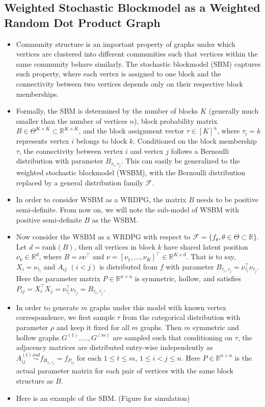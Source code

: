 \documentclass[a4paper]{article}
\begin{document}
\subsection{Weighted Stochastic Blockmodel as a Weighted Random Dot Product Graph}
\label{section:WSBM}
\begin{itemize}
\item Community structure is an important property of graphs under which vertices are clustered into different communities such that vertices within the same community behave similarly. The stochastic blockmodel (SBM) \cite{holland1983stochastic} captures such property, where each vertex is assigned to one block and the connectivity between two vertices depends only on their respective block memberships.
\item Formally, the SBM is determined by the number of blocks $K$ (generally much smaller than the number of vertices $n$), block probability matrix $B \in \Theta^{K \times K} \subset \mathbb{R}^{K \times K}$, and the block assignment vector $\tau \in [K]^n$, where $\tau_i = k$ represents vertex $i$ belongs to block $k$. Conditioned on the block membership $\tau$, the connectivity between vertex $i$ and vertex $j$ follows a Bernoulli distribution with parameter $B_{\tau_i, \tau_j}$. This can easily be generalized to the weighted stochastic blockmodel (WSBM), with the Bernoulli distribution replaced by a general distribution family $\mathcal{F}$.
\item In order to consider WSBM as a WRDPG, the matrix $B$ needs to be positive semi-definite. From now on, we will note the sub-model of WSBM with positive semi-definite $B$ as the WSBM.
\item Now consider the WSBM as a WRDPG with respect to $\mathcal{F} = \{ f_{\theta}, \theta \in \Theta \subset \mathbb{R} \}$. Let $d = 
\mathrm{rank}(B)$, then all vertices in block $k$ have shared latent position $\nu_k \in \mathbb{R}^{d}$, where $B = \nu \nu^{\top}$ and $\nu = [\nu_1, \dotsc, \nu_K]^{\top} \in \mathbb{R}^{K \times d}$. That is to say, $X_i = \nu_{\tau_i}$ and $A_{ij}$ $(i < j)$ is distributed from $f$ with parameter $B_{\tau_i, \tau_j} = \nu_{\tau_i}^{\top} \nu_{\tau_j}$. Here the parameter matrix $P \in \mathbb{R}^{n \times n}$ is symmetric, hollow, and satisfies $P_{ij} = X_i^{\top} X_j = \nu_{\tau_i}^{\top} \nu_{\tau_j} = B_{\tau_i, \tau_j}$.
\item In order to generate $m$ graphs under this model with known vertex correspondence, we first sample $\tau$ from the categorical distribution with parameter $\rho$ and keep it fixed for all $m$ graphs. Then $m$ symmetric and hollow graphs $G^{(1)}, \dotsc, G^{(m)}$ are sampled such that conditioning on $\tau$, the adjacency matrices are distributed entry-wise independently as $A^{(t)}_{ij} \stackrel{ind}{\sim} f_{B_{\tau_i, \tau_j}} = f_{P_{ij}}$ for each $1 \le t \le m$, $1 \le i < j \le n$. Here $P \in \mathbb{R}^{n \times n}$ is the actual parameter matrix for each pair of vertices with the same block structure as $B$.
\item Here is an example of the SBM. (Figure for simulation)
\end{itemize}
\end{document}
